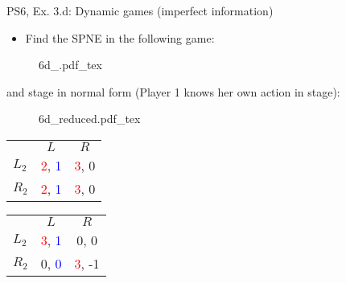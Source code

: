\begin{frame}{PS6, Ex. 3.d: Dynamic games (imperfect information)}
    \begin{itemize}
      \item[(d)] Find the SPNE in the following game:
    \end{itemize}
    \vspace{-4pt}
    \begin{figure}[!h]
      \center
      \def\svgwidth{.8\columnwidth}
      {6d_.pdf_tex}
    \end{figure}
    \vspace{-4pt}
     and  stage in normal form (Player 1 knows her own action in  stage):
    \vspace{-4pt}
    \begin{figure}[!h]
      \center
      \def\svgwidth{.25\columnwidth}
      {6d_reduced.pdf_tex}
    \end{figure}
    \vspace{-9pt}
    \begin{table}
      \begin{tabular}{l|c|c|}
        \multicolumn{1}{c}{} & \multicolumn{1}{c}{\color{blue}$L$} & \multicolumn{1}{c}{$R$} \\\cline{2-3}
        $L_2$ & \textcolor{red}{2}, \textcolor{blue}{1} & \textcolor{red}{3}, 0 \\\cline{2-3}
        $R_2$ & \textcolor{red}{2}, \textcolor{blue}{1} & \textcolor{red}{3}, 0 \\\cline{2-3}
      \end{tabular}
      \enskip
      \begin{tabular}{l|c|c|}
        \multicolumn{1}{c}{} & \multicolumn{1}{c}{\color{blue}$L$} & \multicolumn{1}{c}{$R$} \\\cline{2-3}
        $L_2$ & \textcolor{red}{3}, \textcolor{blue}{1} & 0, 0 \\\cline{2-3}
        $R_2$ & 0, \textcolor{blue}{0} & \textcolor{red}{3}, -1 \\\cline{2-3}
      \end{tabular}
    \end{table}
    \vfill\null
\end{frame}
